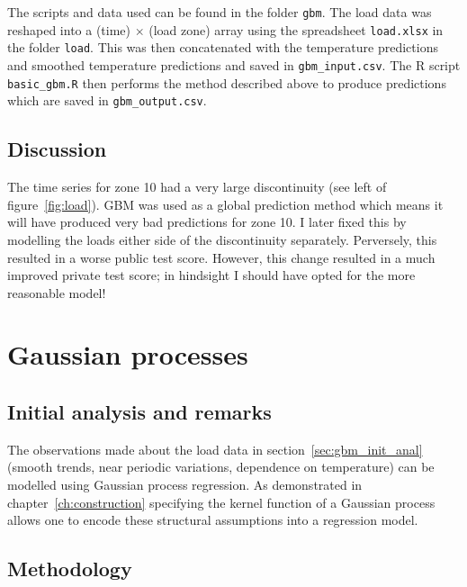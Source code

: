 The scripts and data used can be found in the folder \texttt{gbm}.
The load data was reshaped into a (time) $\times$ (load zone) array using the spreadsheet \texttt{load.xlsx} in the folder \texttt{load}.
This was then concatenated with the temperature predictions and smoothed temperature predictions and saved in \texttt{gbm\_input.csv}.
The R script \texttt{basic\_gbm.R} then performs the method described above to produce predictions which are saved in \texttt{gbm\_output.csv}.

\subsection{Discussion}

The time series for zone 10 had a very large discontinuity (see left of figure~\ref{fig:load}).
GBM was used as a global prediction method which means it will have produced very bad predictions for zone 10.
I later fixed this by modelling the loads either side of the discontinuity separately.
Perversely, this resulted in a worse public test score.
However, this change resulted in a much improved private test score; in hindsight I should have opted for the more reasonable model!

\section{Gaussian processes}

\label{sec:gp}

\subsection{Initial analysis and remarks}

The observations made about the load data in section~\ref{sec:gbm_init_anal} (\ie smooth trends, near periodic variations, dependence on temperature) can be modelled using Gaussian process regression.
As demonstrated in chapter~\ref{ch:construction} specifying the kernel function of a Gaussian process allows one to encode these structural assumptions into a regression model.

\subsection{Methodology}


